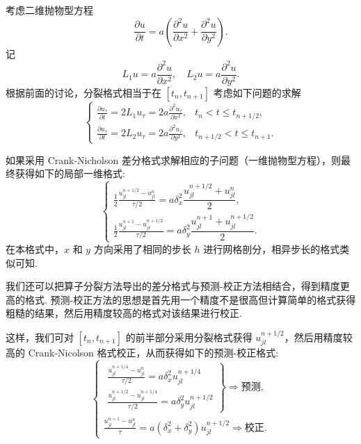 考虑二维抛物型方程
\begin{equation*}
    \frac{\partial u}{\partial t} = a\left(\frac{\partial^2 u}{\partial x^2} + \frac{\partial^2 u}{\partial y^2}\right).
\end{equation*}
记
\begin{equation*}
    L_1 u = a \frac{\partial^2 u}{\partial x^2}, \quad L_2 u = a \frac{\partial^2 u}{\partial y^2}.
\end{equation*}
根据前面的讨论，分裂格式相当于在 $[t_n, t_{n+1}]$ 考虑如下问题的求解
\begin{equation*}
    \begin{cases}
        \frac{\partial u_\tau}{\partial t} = 2L_1 u_\tau = 2a \frac{\partial^2 u_\tau}{\partial x^2}, & t_n < t \leq t_{n+1/2}, \\[7pt]
        \frac{\partial u_\tau}{\partial t} = 2L_2 u_\tau = 2a \frac{\partial^2 u_\tau}{\partial y^2}, & t_{n+1/2} < t \leq t_{n+1}.
    \end{cases}
\end{equation*}

如果采用 Crank-Nicholson 差分格式求解相应的子问题（一维抛物型方程），则最终获得如下的局部一维格式:
\begin{equation*}
    \begin{cases}
        \frac{1}{2} \frac{u_{jl}^{n+1/2} - u_{jl}^n}{\tau/2} = a\delta_x^2 \dfrac{u_{jl}^{n+1/2} + u_{jl}^n}{2}, \\[6pt]
        \frac{1}{2} \frac{u_{jl}^{n+1} - u_{jl}^{n+1/2}}{\tau/2} = a\delta_y^2 \dfrac{u_{jl}^{n+1} + u_{jl}^{n+1/2}}{2}.
    \end{cases}
\end{equation*}
在本格式中，$x$ 和 $y$ 方向采用了相同的步长 $h$ 进行网格剖分，相异步长的格式类似可知.

我们还可以把算子分裂方法导出的差分格式与预测-校正方法相结合，得到精度更高的格式. 预测-校正方法的思想是首先用一个精度不是很高但计算简单的格式获得粗糙的结果，然后用精度较高的格式对该结果进行校正.

这样，我们可对 $[t_n, t_{n+1}]$ 的前半部分采用分裂格式获得 $u_{jl}^{n+1/2}$，然后用精度较高的 Crank-Nicolson 格式校正，从而获得如下的预测-校正格式:
\begin{equation}\label{eq:8.7}
    \begin{cases}
        \left.\begin{aligned}
            \frac{u_{jl}^{n+1/4} - u_{jl}^n}{\tau/2} = a\delta_x^2 u_{jl}^{n+1/4} \\
            \frac{u_{jl}^{n+1/2} - u_{jl}^{n+1/4}}{\tau/2} = a\delta_y^2 u_{jl}^{n+1/2}
        \end{aligned}\right\} \Rightarrow \text{预测}, \\
        \frac{u_{jl}^{n+1} - u_{jl}^n}{\tau} = a(\delta_x^2 + \delta_y^2)u_{jl}^{n+1/2} \Rightarrow \text{校正}.
    \end{cases}
\end{equation}

